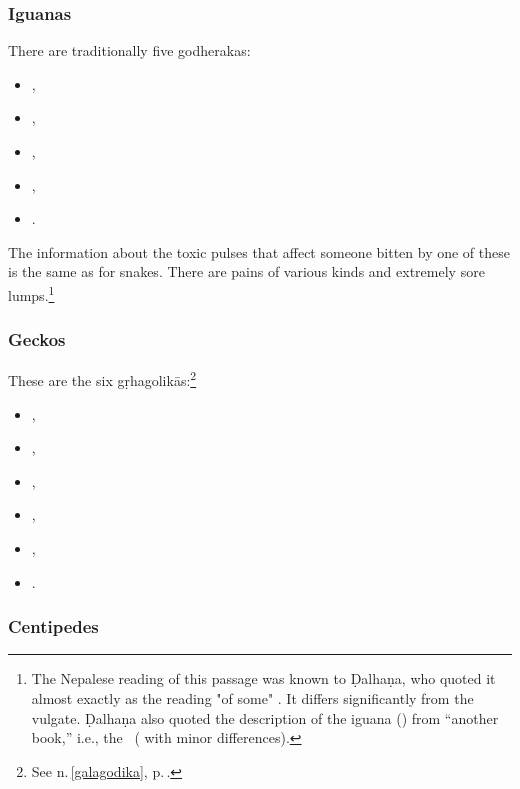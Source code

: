 \begin{translation}
\subsubsection{Iguanas}

\item[28, verses 1, 2]
  \label{godheraka}
There are traditionally five \glspl{godheraka}:
\begin{itemize}
    \item {},
    \item {},
    \item {},
    \item {},
    \item {}.
\end{itemize}
The information about the toxic pulses that affect someone bitten by
one of these is the same as for snakes.  There are pains of various
kinds and extremely sore lumps.\footnote{The Nepalese reading of this
    passage was known to Ḍalhaṇa, who quoted it almost exactly as the
    reading "of some" \citep[587]{vulgate}. It differs significantly from
    the vulgate.  Ḍalhaṇa also quoted the description of the iguana
    () from  “another book,” i.e., the
    \CS\ ( with minor differences).}

\subsubsection{Geckos}

\item[29 verses 1, 2]

These are the six \glspl{gṛhagolikā}:\footnote{See n.\,\ref{galagodika}, 
    p.\,\pageref{galagodika}.}
\begin{itemize}
    \item {},
    \item {},
    \item {},
    \item {},
    \item {},
    \item {}.
\end{itemize}


\subsubsection{Centipedes}


\end{translation}
